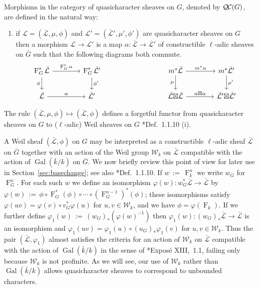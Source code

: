 \documentclass[11pt]{amsart}
\makeatletter
\theoremstyle{plain}
\theoremstyle{definition}
\theoremstyle{remark}
\newcommand{\bFq}{\bar{k}}
\newcommand{\Fq}{k}
\DeclareMathOperator{\Gal}{Gal}
\newcommand{\Frob}[1]{\operatorname{F}_{#1}}
\newcommand{\ceq}{{\, :=\, }}
\newcommand{\qcs}[1]{{\mathcal{#1}}}
\newcommand{\gqcs}[1]{{\mathcal{\bar #1}}}
\newcommand{\QC}{{\mathcal{Q\hskip-0.8pt C}}}
\newcommand{\Weil}[1]{\mathcal{W}_{#1}}
\newcommand{\labitem}[2]{%
\def\@itemlabel{\textbf{#1}}
\item
\def\@currentlabel{#1}\label{#2}}
\newcommand{\bG}{\bar{G}}
\newcommand{\tight}[3]{\hspace{-#1pt}{#2}\hspace{-#3pt}}
\newcommand{\LxL}{\text{$\gqcs{L} \tight{0}{\boxtimes}{0} \gqcs{L}$}}
\newcommand\Clifton[1]{\marginpar{\smaller\smaller CC: #1}}
\makeatother
\begin{document}
Morphisms in the category of quasicharacter sheaves on $G$, denoted by $\QC(G)$, are defined in the natural way:
\begin{enumerate}
\labitem{(CS.4)}{CS.4} if $\qcs{L} = (\gqcs{L},\mu,\phi)$ and
  $\qcs{L'} = (\gqcs{L'},\mu',\phi')$ are quasicharacter sheaves on $G$ then
  a morphism $\qcs{L} \to \qcs{L}'$ is a map $\alpha : \gqcs{L} \to \gqcs{L'}$
  of constructible $\ell$-adic sheaves on $\bG$ such that the following diagrams both commute.
  \[
  \begin{tikzcd}[column sep=40]
  \Frob{G}^* \gqcs{L} \rar{\Frob{G}^* \alpha} \arrow[swap]{d}{\phi} & \Frob{G}^* \gqcs{L'} \dar{\phi'}
  & %
  & \arrow[swap]{d}{\mu} m^* \gqcs{L} \rar{m^* \alpha} & m^* \gqcs{L'} \dar{\mu'} \\
  \gqcs{L} \rar{\alpha} & \gqcs{L'}
  & {} & \LxL \rar{\tight{1}{\alpha\boxtimes \alpha}{1}} & \gqcs{L'} \tight{0}{\boxtimes}{0} \gqcs{L'}
  \end{tikzcd}
  \]
\end{enumerate}

The rule $(\gqcs{L},\mu,\phi) \mapsto (\gqcs{L},\phi)$ defines a forgetful functor from quasicharacter
sheaves on $G$ to ($\ell$-adic) Weil sheaves on $G$ \cite{deligne:80a}*{Def.~1.1.10 (i)}.

A Weil sheaf $(\gqcs{L},\phi)$ on $G$
may be interpreted as a constructible $\ell$-adic sheaf $\gqcs{L}$ on $\bG$ together with
an action of the Weil group $\Weil{\Fq}$ on $\gqcs{L}$ compatible with the action of
$\Gal(\bFq/\Fq)$ on $\bG$. We now briefly review this point of view for later use in
Section~\ref{sec:basechange}; see also \cite{deligne:80a}*{Def.~1.1.10}.  If $w \ceq \Frob{\Fq}^n$ we write $w_G$ for $\Frob{G}^n$.
For each such $w$ we define an isomorphism $\varphi(w) : w_G^* \gqcs{L}\to \gqcs{L}$ by
$
\varphi(w) \ceq  \phi \circ \Frob{G}^*(\phi) \circ \cdots \circ (\Frob{G}^{n-1})^*(\phi)
$; 
these isomorphisms satisfy $\varphi(uv) = \varphi(v) \circ v_G^* \varphi(u)$ for $u,v\in \Weil{\Fq}$, and
we have $\phi = \varphi(\Frob{\Fq})$. 
If we further define $\varphi_1(w) \ceq (w_G)_*(\varphi(w)^{-1})$ then
$\varphi_1(w) : (w_G)_* \gqcs{L}\to \gqcs{L}$ is an isomorphism and
$\varphi_1(uv) = \varphi_1(u) \circ (u_G)_* \varphi_1(v)$ for $u,v\in \Weil{\Fq}$.
Thus the pair $(\gqcs{L},\varphi_1)$ almost satisfies the criteria for an action of $\Weil{\Fq}$
on $\gqcs{L}$ compatible with the action of $\Gal(\bFq/\Fq)$ in the sense of
\cite{deligne:SGA4.5}*{Expos\'e XIII,~1.1}, failing only because $\Weil{\Fq}$ is not profinite.
\Clifton{Improve this.}
As we will see, our use of $\Weil{\Fq}$ rather than $\Gal(\bFq/\Fq)$ allows quasicharacter sheaves to
correspond to unbounded characters.
\end{document}
